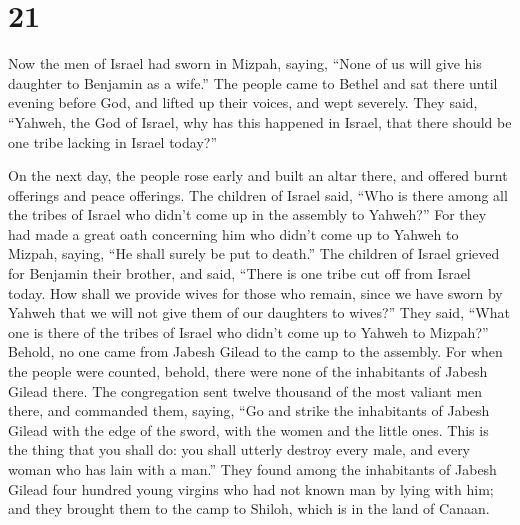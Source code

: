 \hypertarget{section-20}{%
\section{21}\label{section-20}}

 Now the men of Israel had sworn in Mizpah, saying, ``None
of us will give his daughter to Benjamin as a wife.''  The
people came to Bethel and sat there until evening before God, and lifted
up their voices, and wept severely.  They said, ``Yahweh,
the God of Israel, why has this happened in Israel, that there should be
one tribe lacking in Israel today?''

 On the next day, the people rose early and built an altar
there, and offered burnt offerings and peace offerings.  The
children of Israel said, ``Who is there among all the tribes of Israel
who didn't come up in the assembly to Yahweh?'' For they had made a
great oath concerning him who didn't come up to Yahweh to Mizpah,
saying, ``He shall surely be put to death.''  The children
of Israel grieved for Benjamin their brother, and said, ``There is one
tribe cut off from Israel today.  How shall we provide wives
for those who remain, since we have sworn by Yahweh that we will not
give them of our daughters to wives?''  They said, ``What
one is there of the tribes of Israel who didn't come up to Yahweh to
Mizpah?'' Behold, no one came from Jabesh Gilead to the camp to the
assembly.  For when the people were counted, behold, there
were none of the inhabitants of Jabesh Gilead there.  The
congregation sent twelve thousand of the most valiant men there, and
commanded them, saying, ``Go and strike the inhabitants of Jabesh Gilead
with the edge of the sword, with the women and the little ones.
 This is the thing that you shall do: you shall utterly
destroy every male, and every woman who has lain with a man.''
 They found among the inhabitants of Jabesh Gilead four
hundred young virgins who had not known man by lying with him; and they
brought them to the camp to Shiloh, which is in the land of Canaan.


